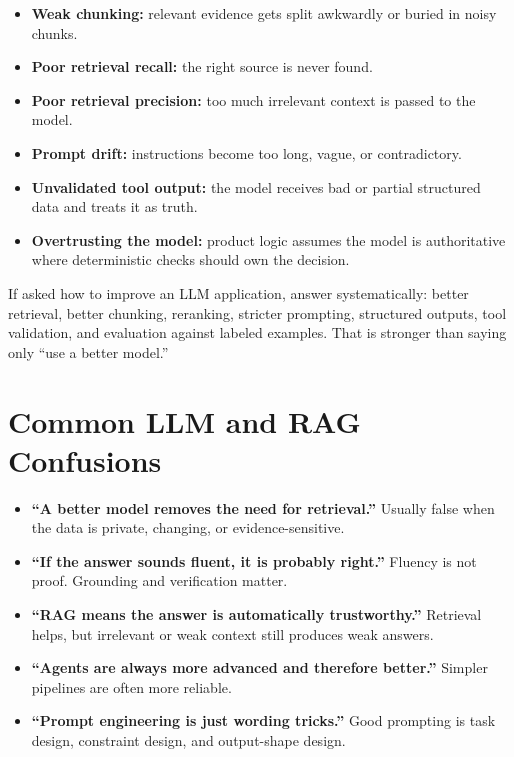 \documentclass[12pt, a4paper, oneside]{book}
\begin{document}
\begin{itemize}[leftmargin=2em]
    \item \textbf{Weak chunking:} relevant evidence gets split awkwardly or buried in noisy chunks.
    \item \textbf{Poor retrieval recall:} the right source is never found.
    \item \textbf{Poor retrieval precision:} too much irrelevant context is passed to the model.
    \item \textbf{Prompt drift:} instructions become too long, vague, or contradictory.
    \item \textbf{Unvalidated tool output:} the model receives bad or partial structured data and treats it as truth.
    \item \textbf{Overtrusting the model:} product logic assumes the model is authoritative where deterministic checks should own the decision.
\end{itemize}

\begin{examtipbox}
If asked how to improve an LLM application, answer systematically: better retrieval, better chunking, reranking, stricter prompting, structured outputs, tool validation, and evaluation against labeled examples. That is stronger than saying only ``use a better model.''
\end{examtipbox}

\section{Common LLM and RAG Confusions}

\begin{itemize}[leftmargin=2em]
    \item \textbf{``A better model removes the need for retrieval.''} Usually false when the data is private, changing, or evidence-sensitive.
    \item \textbf{``If the answer sounds fluent, it is probably right.''} Fluency is not proof. Grounding and verification matter.
    \item \textbf{``RAG means the answer is automatically trustworthy.''} Retrieval helps, but irrelevant or weak context still produces weak answers.
    \item \textbf{``Agents are always more advanced and therefore better.''} Simpler pipelines are often more reliable.
    \item \textbf{``Prompt engineering is just wording tricks.''} Good prompting is task design, constraint design, and output-shape design.
\end{itemize}
\end{document}
